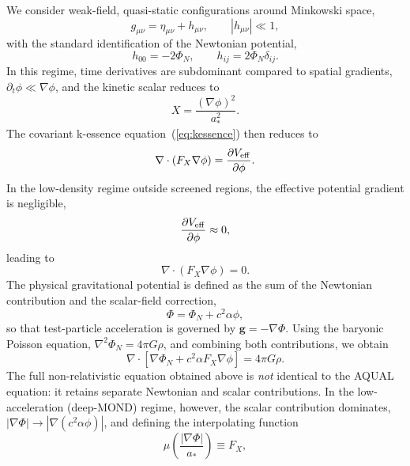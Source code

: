 \documentclass[11pt,a4paper]{article}
\begin{document}
We consider weak-field, quasi-static configurations around Minkowski space,
\begin{equation}
  g_{\mu\nu} = \eta_{\mu\nu} + h_{\mu\nu}, \qquad |h_{\mu\nu}| \ll 1,
\end{equation}
with the standard identification of the Newtonian potential,
\begin{equation}
  h_{00} = -2\Phi_N, \qquad h_{ij} = 2\Phi_N \delta_{ij}.
\end{equation}
In this regime, time derivatives are subdominant compared to spatial gradients,
$\partial_t \phi \ll \nabla \phi$, and the kinetic scalar reduces to
\begin{equation}
  X = \frac{(\nabla \phi)^2}{a_*^2}.
\end{equation}
The covariant k-essence equation~(\ref{eq:kessence}) then reduces to
\begin{equation}
  \nabla \cdot \left( F_X \nabla \phi \right) = \frac{\partial V_{\rm eff}}{\partial \phi}.
\end{equation}
In the low-density regime outside screened regions, the effective potential
gradient is negligible,
\begin{equation}
  \frac{\partial V_{\rm eff}}{\partial \phi} \approx 0,
\end{equation}
leading to
\begin{equation}
  \nabla \cdot \left( F_X \nabla \phi \right) = 0.
\end{equation}
The physical gravitational potential is defined as the sum of the Newtonian
contribution and the scalar-field correction,
\begin{equation}
  \Phi = \Phi_N + c^2 \alpha \phi,
\end{equation}
so that test-particle acceleration is governed by $\mathbf{g} = -\nabla \Phi$.
Using the baryonic Poisson equation,
$\nabla^2 \Phi_N = 4\pi G \rho$,
and combining both contributions, we obtain
\begin{equation}
  \nabla \cdot \left[ \nabla \Phi_N + c^2 \alpha F_X \nabla \phi \right]
  = 4\pi G \rho.
\end{equation}
The full non-relativistic equation obtained above is \emph{not} identical to the AQUAL
equation: it retains separate Newtonian and scalar contributions. In the low-acceleration
(deep-MOND) regime, however, the scalar contribution dominates,
$|\nabla\Phi|\to|\nabla(c^2\alpha\phi)|$, and defining the interpolating function
\begin{equation}
  \mu\!\left(\frac{|\nabla \Phi|}{a_*}\right) \equiv F_X,
\end{equation}
\end{document}
